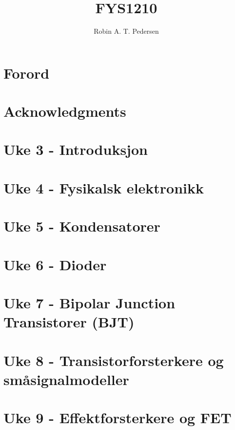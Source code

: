 \documentclass{article}
\begin{document}
  \title{FYS1210}
  \author{Robin A. T. Pedersen}
  \maketitle
  \tableofcontents

  \section{Forord}
    

  \section{Acknowledgments}
    

  \section{Uke 3 - Introduksjon}
    

  \section{Uke 4 - Fysikalsk elektronikk}
    

  \section{Uke 5 - Kondensatorer}
    

  \section{Uke 6 - Dioder}
    

  \section{Uke 7 - Bipolar Junction Transistorer (BJT)}
    

  \section{Uke 8 - Transistorforsterkere og småsignalmodeller}
    

  \section{Uke 9 - Effektforsterkere og FET}
    
\end{document}
